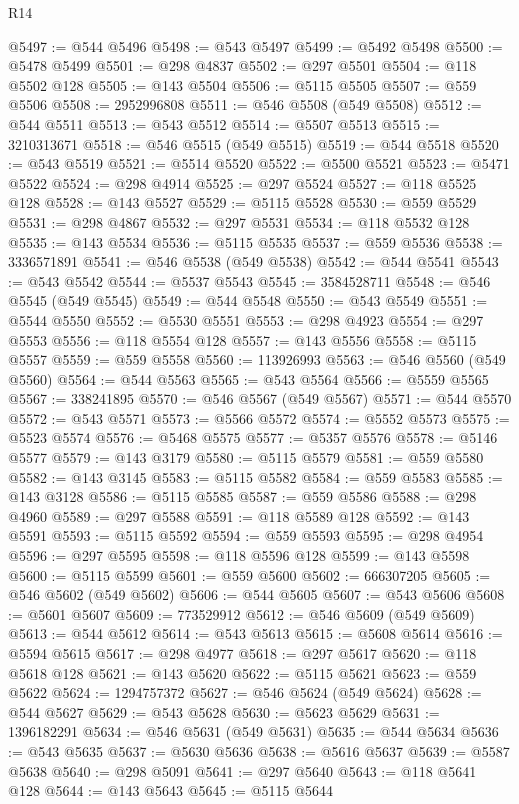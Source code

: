 \begin{lexlean}{R14}
\begin{coremodule}
{{{{{{{{{{{{{{{{{{{{{{{{{{{{{{{{{{{{{{{{{{{{{{{{{{{{{{{{{{{{{{{{{{{{{{{{{{{{{{{{{{@5497 := @544 @5496
@5498 := @543 @5497
@5499 := @5492 @5498
@5500 := @5478 @5499
@5501 := @298 @4837
@5502 := @297 @5501
@5504 := @118 @5502 @128
@5505 := @143 @5504
@5506 := @5115 @5505
@5507 := @559 @5506
@5508 := 2952996808
@5511 := @546 @5508 (@549 @5508)
@5512 := @544 @5511
@5513 := @543 @5512
@5514 := @5507 @5513
@5515 := 3210313671
@5518 := @546 @5515 (@549 @5515)
@5519 := @544 @5518
@5520 := @543 @5519
@5521 := @5514 @5520
@5522 := @5500 @5521
@5523 := @5471 @5522
@5524 := @298 @4914
@5525 := @297 @5524
@5527 := @118 @5525 @128
@5528 := @143 @5527
@5529 := @5115 @5528
@5530 := @559 @5529
@5531 := @298 @4867
@5532 := @297 @5531
@5534 := @118 @5532 @128
@5535 := @143 @5534
@5536 := @5115 @5535
@5537 := @559 @5536
@5538 := 3336571891
@5541 := @546 @5538 (@549 @5538)
@5542 := @544 @5541
@5543 := @543 @5542
@5544 := @5537 @5543
@5545 := 3584528711
@5548 := @546 @5545 (@549 @5545)
@5549 := @544 @5548
@5550 := @543 @5549
@5551 := @5544 @5550
@5552 := @5530 @5551
@5553 := @298 @4923
@5554 := @297 @5553
@5556 := @118 @5554 @128
@5557 := @143 @5556
@5558 := @5115 @5557
@5559 := @559 @5558
@5560 := 113926993
@5563 := @546 @5560 (@549 @5560)
@5564 := @544 @5563
@5565 := @543 @5564
@5566 := @5559 @5565
@5567 := 338241895
@5570 := @546 @5567 (@549 @5567)
@5571 := @544 @5570
@5572 := @543 @5571
@5573 := @5566 @5572
@5574 := @5552 @5573
@5575 := @5523 @5574
@5576 := @5468 @5575
@5577 := @5357 @5576
@5578 := @5146 @5577
@5579 := @143 @3179
@5580 := @5115 @5579
@5581 := @559 @5580
@5582 := @143 @3145
@5583 := @5115 @5582
@5584 := @559 @5583
@5585 := @143 @3128
@5586 := @5115 @5585
@5587 := @559 @5586
@5588 := @298 @4960
@5589 := @297 @5588
@5591 := @118 @5589 @128
@5592 := @143 @5591
@5593 := @5115 @5592
@5594 := @559 @5593
@5595 := @298 @4954
@5596 := @297 @5595
@5598 := @118 @5596 @128
@5599 := @143 @5598
@5600 := @5115 @5599
@5601 := @559 @5600
@5602 := 666307205
@5605 := @546 @5602 (@549 @5602)
@5606 := @544 @5605
@5607 := @543 @5606
@5608 := @5601 @5607
@5609 := 773529912
@5612 := @546 @5609 (@549 @5609)
@5613 := @544 @5612
@5614 := @543 @5613
@5615 := @5608 @5614
@5616 := @5594 @5615
@5617 := @298 @4977
@5618 := @297 @5617
@5620 := @118 @5618 @128
@5621 := @143 @5620
@5622 := @5115 @5621
@5623 := @559 @5622
@5624 := 1294757372
@5627 := @546 @5624 (@549 @5624)
@5628 := @544 @5627
@5629 := @543 @5628
@5630 := @5623 @5629
@5631 := 1396182291
@5634 := @546 @5631 (@549 @5631)
@5635 := @544 @5634
@5636 := @543 @5635
@5637 := @5630 @5636
@5638 := @5616 @5637
@5639 := @5587 @5638
@5640 := @298 @5091
@5641 := @297 @5640
@5643 := @118 @5641 @128
@5644 := @143 @5643
@5645 := @5115 @5644
}}}}}}}}}}}}}}}}}}}}}}}}}}}}}}}}}}}}}}}}}}}}}}}}}}}}}}}}}}}}}}}}}}}}}}}}}}}}}}}}}}
\end{coremodule}
\end{lexlean}
